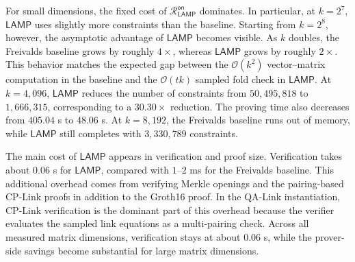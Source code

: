 \documentclass[conference,compsoc]{IEEEtran}
\newcommand{\relation}{{\mathcal{R}}}
\newcommand{\protocol}{\textsf{LAMP}}   %
\theoremstyle{plain}
\theoremstyle{definition}
\theoremstyle{remark}
\begin{document}
For small dimensions, the fixed cost of
\(\relation_{\mathsf{LAMP}}^{\mathsf{on}}\) dominates. In particular, at
\(k=2^7\), \(\protocol\) uses slightly more constraints than the baseline.
Starting from \(k=2^8\), however, the asymptotic advantage of \(\protocol\)
becomes visible. As \(k\) doubles, the Freivalds baseline grows by roughly
\(4\times\), whereas \(\protocol\) grows by roughly \(2\times\). This behavior
matches the expected gap between the \(\mathcal{O}(k^2)\) vector--matrix
computation in the baseline and the \(\mathcal{O}(tk)\) sampled fold check in
\(\protocol\).
At \(k=4{,}096\), \(\protocol\) reduces the number of constraints from
\(50{,}495{,}818\) to \(1{,}666{,}315\), corresponding to a \(30.30\times\)
reduction. The proving time also decreases from \(405.04\) s to \(48.06\) s.
At \(k=8{,}192\), the Freivalds baseline runs out of memory, while
\(\protocol\) still completes with \(3{,}330{,}789\) constraints.

The main cost of \(\protocol\) appears in verification and proof size.
Verification takes about \(0.06\) s for \(\protocol\), compared with
\(1\)--\(2\) ms for the Freivalds baseline. This additional overhead comes from
verifying Merkle openings and the pairing-based CP-Link proofs in addition to
the Groth16 proof. In the QA-Link instantiation, CP-Link verification is the
dominant part of this overhead because the verifier evaluates the sampled link
equations as a multi-pairing check. Across all measured matrix dimensions, verification stays at about \(0.06\) s, while the prover-side savings become substantial for large matrix dimensions.
\end{document}
